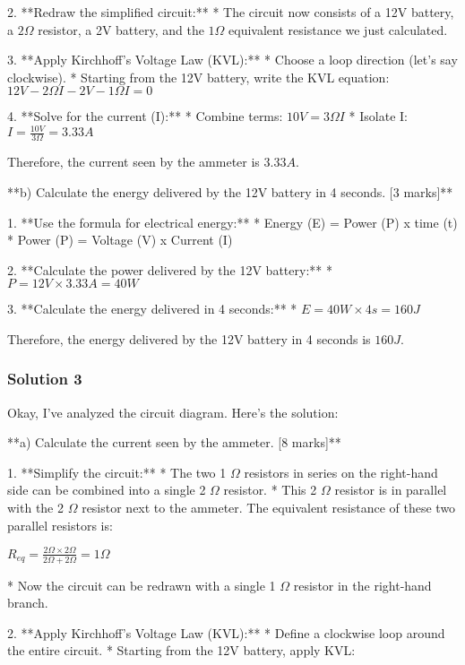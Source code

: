 \documentclass{article}
\begin{document}
2. **Redraw the simplified circuit:**
    * The circuit now consists of a 12V battery, a \(2\Omega\) resistor, a 2V battery, and the \(1\Omega\) equivalent resistance we just calculated.

3. **Apply Kirchhoff's Voltage Law (KVL):**
    * Choose a loop direction (let's say clockwise). 
    * Starting from the 12V battery, write the KVL equation:
        \(12V - 2\Omega I - 2V - 1\Omega I = 0\)

4. **Solve for the current (I):**
    * Combine terms: \(10V = 3\Omega I\)
    * Isolate I: \(I = \frac{10V}{3\Omega} = 3.33A\)

Therefore, the current seen by the ammeter is \(\boxed{3.33A}\).


**b) Calculate the energy delivered by the 12V battery in 4 seconds. [3 marks]**

1. **Use the formula for electrical energy:**
    * Energy (E) = Power (P) x time (t)
    * Power (P) = Voltage (V) x Current (I)

2. **Calculate the power delivered by the 12V battery:**
    * \(P = 12V \times 3.33A = 40W\)

3. **Calculate the energy delivered in 4 seconds:**
    * \(E = 40W \times 4s = 160J\)

Therefore, the energy delivered by the 12V battery in 4 seconds is \(\boxed{160J}\).


\subsubsection{Solution 3}
Okay, I've analyzed the circuit diagram. Here's the solution:

**a) Calculate the current seen by the ammeter. [8 marks]**

1. **Simplify the circuit:**
    * The two 1 $\Omega$ resistors in series on the right-hand side can be combined into a single 2 $\Omega$ resistor. 
    * This 2 $\Omega$ resistor is in parallel with the 2 $\Omega$ resistor next to the ammeter. The equivalent resistance of these two parallel resistors is:
    
    $R_{eq} = \frac{2 \Omega \times 2 \Omega}{2 \Omega + 2 \Omega} = 1 \Omega$

    * Now the circuit can be redrawn with a single 1 $\Omega$ resistor in the right-hand branch.

2. **Apply Kirchhoff's Voltage Law (KVL):**
    * Define a clockwise loop around the entire circuit.
    * Starting from the 12V battery, apply KVL:
\end{document}

